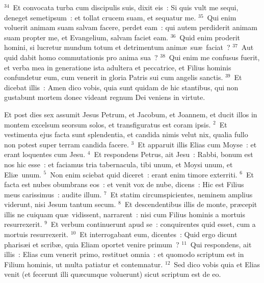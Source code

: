 ${}^{34}$~Et convocata turba cum discipulis suis, dixit eis~: Si quis vult me sequi, deneget semetipsum~: et tollat crucem suam, et sequatur me.
${}^{35}$~Qui enim voluerit animam suam salvam facere, perdet eam~: qui autem perdiderit animam suam propter me, et Evangelium, salvam faciet eam.
${}^{36}$~Quid enim proderit homini, si lucretur mundum totum et detrimentum anim\ae\ su\ae\ faciat~?
${}^{37}$~Aut quid dabit homo commutationis pro anima sua~?
${}^{38}$~Qui enim me confusus fuerit, et verba mea in generatione ista adultera et peccatrice, et Filius hominis confundetur eum, cum venerit in gloria Patris sui cum angelis sanctis.
${}^{39}$~Et dicebat illis~: Amen dico vobis, quia sunt quidam de hic stantibus, qui non gustabunt mortem donec videant regnum Dei veniens in virtute.

\lettrine[lines=3,image=true,loversize=0.05,lraise=-0.03]{E}{}t post dies sex assumit Jesus Petrum, et Jacobum, et Joannem, et ducit illos in montem excelsum seorsum solos, et transfiguratus est coram ipsis.
${}^{2}$~Et vestimenta ejus facta sunt splendentia, et candida nimis velut nix, qualia fullo non potest super terram candida facere.
${}^{3}$~Et apparuit illis Elias cum Moyse~: et erant loquentes cum Jesu.
${}^{4}$~Et respondens Petrus, ait Jesu~: Rabbi, bonum est nos hic esse~: et faciamus tria tabernacula, tibi unum, et Moysi unum, et Eli\ae\ unum.
${}^{5}$~Non enim sciebat quid diceret~: erant enim timore exterriti.
${}^{6}$~Et facta est nubes obumbrans eos~: et venit vox de nube, dicens~: Hic est Filius meus carissimus~: audite illum.
${}^{7}$~Et statim circumspicientes, neminem amplius viderunt, nisi Jesum tantum secum.
${}^{8}$~Et descendentibus illis de monte, pr\ae cepit illis ne cuiquam qu\ae\ vidissent, narrarent~: nisi cum Filius hominis a mortuis resurrexerit.
${}^{9}$~Et verbum continuerunt apud se~: conquirentes quid esset, cum a mortuis resurrexerit.
${}^{10}$~Et interrogabant eum, dicentes~: Quid ergo dicunt pharis\ae i et scrib\ae , quia Eliam oportet venire primum~?
${}^{11}$~Qui respondens, ait illis~: Elias cum venerit primo, restituet omnia~: et quomodo scriptum est in Filium hominis, ut multa patiatur et contemnatur.
${}^{12}$~Sed dico vobis quia et Elias venit (et fecerunt illi qu\ae cumque voluerunt) sicut scriptum est de eo.


